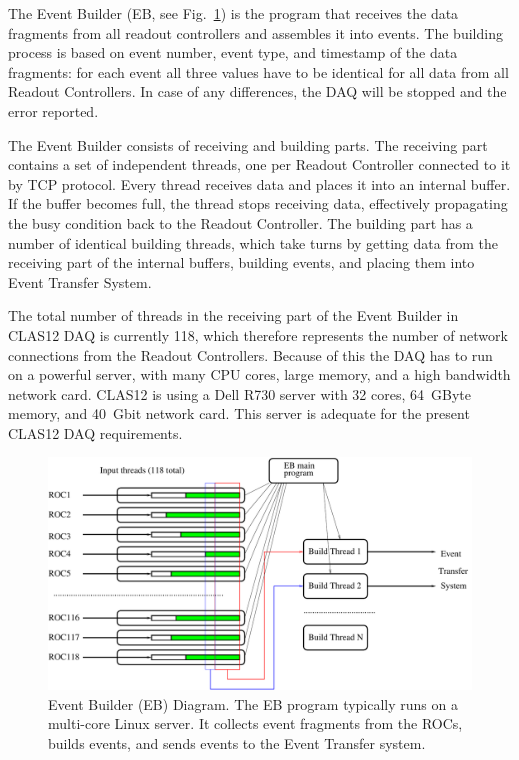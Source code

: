 The Event Builder (EB, see Fig.~\ref{fig:eb_diagram}) is the program that receives the data fragments from all readout controllers and assembles it into events. The building process is based on event number, event type, and timestamp of the data fragments: for each event all three values have to be identical for all data from all Readout Controllers. In case of any differences, the DAQ will be stopped and the error reported.

The Event Builder consists of receiving and building parts. The receiving part contains a set of independent threads, one per Readout Controller connected to it by TCP protocol. Every thread receives data and places it into an internal buffer. If the buffer becomes full, the thread stops receiving data, effectively propagating the busy condition back to the Readout Controller. The building part has a number of identical building threads, which take turns by getting data from the receiving part of the internal buffers, building events, and placing them into Event Transfer System.

The total number of threads in the receiving part of the Event Builder in CLAS12 DAQ is currently 118, which therefore represents the number of network connections from the Readout Controllers. Because of this the DAQ has to run on a powerful server, with many CPU cores, large memory, and a high bandwidth network card. CLAS12 is using a Dell R730 server with 32 cores, 64~GByte memory, and 40~Gbit network card. This server is adequate for the present CLAS12 DAQ requirements.

\begin{figure}[hbt]
	\centering
	\includegraphics[width=1.0\columnwidth,keepaspectratio]{img/eb_diagram.pdf}
	\caption{Event Builder (EB) Diagram. The EB program typically runs on a multi-core Linux server. It collects event fragments from the ROCs, builds events, and sends events to the Event Transfer system.}
	\label{fig:eb_diagram}
\end{figure}


